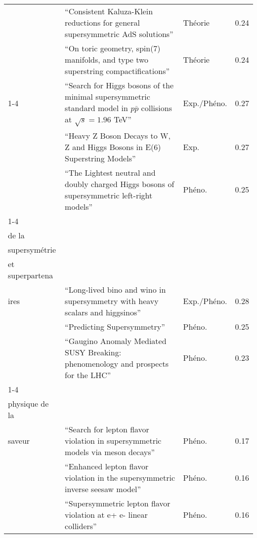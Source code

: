 \begin{longtable}[H]{p{}|p{}|p{}|p{}}
                                                                    & ``Consistent Kaluza-Klein reductions for general supersymmetric AdS solutions'' &      Théorie &         0.24 \\
                                                                    & ``On toric geometry, spin(7) manifolds, and type two superstring compactifications'' &      Théorie &         0.24 \\
\cline{1-4}
\multirow{3}{*}{\begin{tabular}{l}Boson de Higgs\end{tabular}} & ``Search for Higgs bosons of the minimal supersymmetric standard model in $p\bar{p}$ collisions at $\sqrt{s}=1.96$ TeV'' &  Exp./Phéno. &         0.27 \\
                                                                    & ``Heavy Z Boson Decays to W, Z and Higgs Bosons in E(6) Superstring Models'' &         Exp. &         0.27 \\
                                                                    & ``The Lightest neutral and doubly charged Higgs bosons of supersymmetric left-right models'' &       Phéno. &         0.25 \\
\cline{1-4}
\multirow{3}{*}{\begin{tabular}{l}Phénoménologie\\ de la\\ supersymétrie\\ et superpartena\\ ires\end{tabular}} & ``Long-lived bino and wino in supersymmetry with heavy scalars and higgsinos'' &  Exp./Phéno. &         0.28 \\
                                                                    & ``Predicting Supersymmetry'' &       Phéno. &         0.25 \\
                                                                    & ``Gaugino Anomaly Mediated SUSY Breaking: phenomenology and prospects for the LHC'' &       Phéno. &         0.23 \\
\cline{1-4}
\multirow{3}{*}{\begin{tabular}{l}Leptons et\\ physique de la\\ saveur\end{tabular}} & ``Search for lepton flavor violation in supersymmetric models via meson decays'' &       Phéno. &         0.17 \\
                                                                    & ``Enhanced lepton flavor violation in the supersymmetric inverse seesaw model'' &       Phéno. &         0.16 \\
                                                                    & ``Supersymmetric lepton flavor violation at e+ e- linear colliders'' &       Phéno. &         0.16 \\
\end{longtable}
